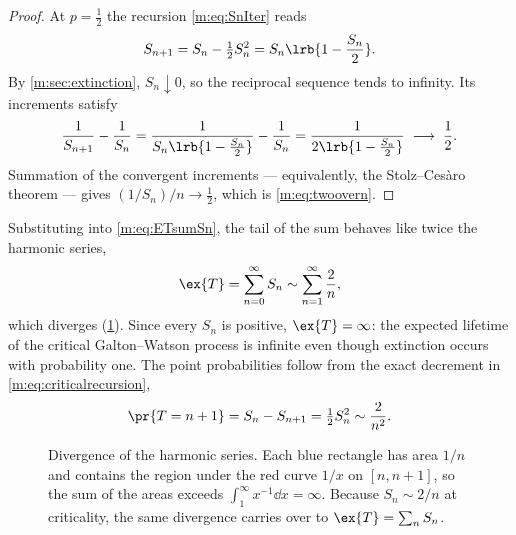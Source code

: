 \begin{proof}
At $p=\tfrac12$ the recursion \cref{m:eq:SnIter} reads
\begin{equation}
\label{m:eq:criticalrecursion}
S_{n+1} = S_n-\tfrac12S_n^2 = S_n\lrb{1-\frac{S_n}{2}} .
\end{equation}
By \cref{m:sec:extinction}, $S_n\downarrow0$, so the reciprocal sequence tends to
infinity. Its increments satisfy
\begin{equation}
\label{m:eq:reciprocalincrement}
\frac{1}{S_{n+1}}-\frac{1}{S_n}
= \frac{1}{S_n\lrb{1-\frac{S_n}{2}}}-\frac{1}{S_n}
= \frac{1}{2\lrb{1-\frac{S_n}{2}}}
\;\longrightarrow\;\frac12 .
\end{equation}
Summation of the convergent increments --- equivalently, the Stolz--Ces\`aro
theorem --- gives $(1/S_n)/n\to\tfrac12$, which is \cref{m:eq:twoovern}.
\end{proof}

Substituting into \cref{m:eq:ETsumSn}, the tail of the sum behaves like twice the
harmonic series,
\begin{equation*}
\ex{T} = \sum_{n=0}^{\infty}S_n\sim\sum_{n=1}^{\infty}\frac{2}{n},
\end{equation*}
which diverges (\cref{m:fig:harmonic}). Since every $S_n$ is positive,
$\ex{T}=\infty$: the expected lifetime of the critical Galton--Watson process is
infinite even though extinction occurs with probability one. The point
probabilities follow from the exact decrement in \cref{m:eq:criticalrecursion},
\begin{equation}
\label{m:eq:criticalTtail}
\pr{T=n+1} = S_n-S_{n+1} = \tfrac12S_n^2\sim\frac{2}{n^2} .
\end{equation}

\begin{figure}[H]
    \centering
{}
\caption{Divergence of the harmonic series. Each blue rectangle has area $1/n$ and
contains the region under the red curve $1/x$ on $[n,n+1]$, so the sum of the areas
exceeds $\int_1^\infty x^{-1}\dd x=\infty$. Because $S_n\sim2/n$ at criticality,
the same divergence carries over to $\ex{T}=\sum_nS_n$.}
\label{m:fig:harmonic}
\end{figure}

